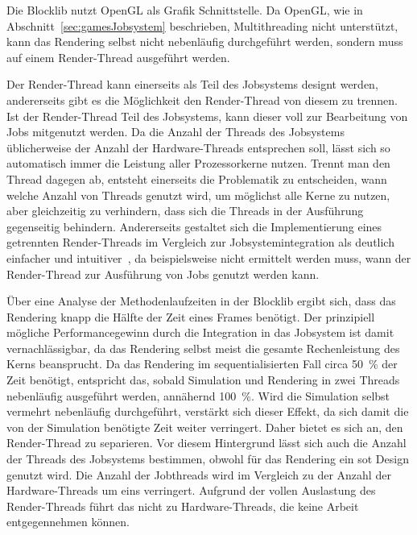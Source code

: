 
Die Blocklib nutzt OpenGL als Grafik Schnittstelle. Da OpenGL, wie in Abschnitt~\ref{sec:gamesJobsystem} beschrieben, Multithreading nicht unterstützt, kann das Rendering selbst nicht nebenläufig durchgeführt werden, sondern muss auf einem Render-Thread ausgeführt werden.

Der Render-Thread kann einerseits als Teil des Jobsystems designt werden, andererseits gibt es die Möglichkeit den Render-Thread von diesem zu trennen. Ist der Render-Thread Teil des Jobsystems, kann dieser voll zur Bearbeitung von Jobs mitgenutzt werden. Da die Anzahl der Threads des Jobsystems üblicherweise der Anzahl der Hardware-Threads entsprechen soll, lässt sich so automatisch immer die Leistung aller Prozessorkerne nutzen. Trennt man den Thread dagegen ab, entsteht einerseits die Problematik zu entscheiden, wann welche Anzahl von Threads genutzt wird, um möglichst alle Kerne zu nutzen, aber gleichzeitig zu verhindern, dass sich die Threads in der Ausführung gegenseitig behindern. Andererseits gestaltet sich die Implementierung eines getrennten Render-Threads im Vergleich zur Jobsystemintegration als deutlich einfacher und intuitiver~\cite{Tatarchuk2014}, da beispielsweise nicht ermittelt werden muss, wann der Render-Thread zur Ausführung von Jobs genutzt werden kann.

Über eine Analyse der Methodenlaufzeiten in der Blocklib ergibt sich, dass das Rendering knapp die Hälfte der Zeit eines Frames benötigt. Der prinzipiell mögliche Performancegewinn durch die Integration in das Jobsystem ist damit vernachlässigbar, da das Rendering selbst meist die gesamte Rechenleistung des Kerns beansprucht. Da das Rendering im sequentialisierten Fall circa \SI{50}{\percent} der Zeit benötigt, entspricht das, sobald Simulation und Rendering in zwei Threads nebenläufig ausgeführt werden, annähernd \SI{100}{\percent}. Wird die Simulation selbst vermehrt nebenläufig durchgeführt, verstärkt sich dieser Effekt, da sich damit die von der Simulation benötigte Zeit weiter verringert. Daher bietet es sich an, den Render-Thread zu separieren. Vor diesem Hintergrund lässt sich auch die Anzahl der Threads des Jobsystems bestimmen, obwohl für das Rendering ein \ac{sot} Design genutzt wird. Die Anzahl der Jobthreads wird im Vergleich zu der Anzahl der Hardware-Threads um eins verringert. Aufgrund der vollen Auslastung des Render-Threads führt das nicht zu Hardware-Threads, die keine Arbeit entgegennehmen können.


